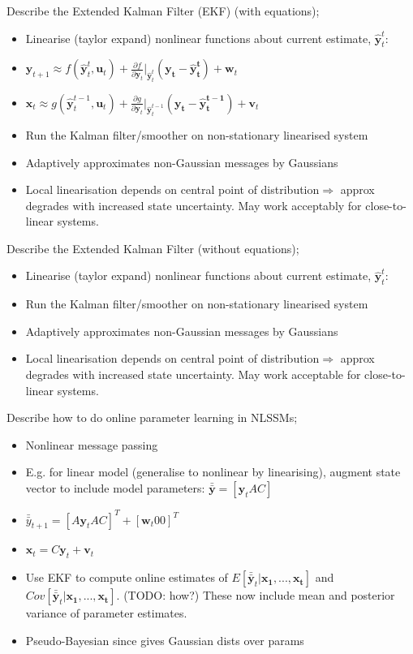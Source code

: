\documentclass{article}
\begin{document}
Describe the Extended Kalman Filter (EKF) (with equations); \begin{itemize} \item Linearise (taylor expand) nonlinear functions about current estimate, $\mathbf{\hat{y}}^t_t$: \item $\mathbf{y}_{t+1}\approx f(\mathbf{\hat{y}}^t_t, \mathbf{u}_t) + \frac{\partial f}{\partial \mathbf{y}_t}|_{\hat{\mathbf{y}}^t_t}(\mathbf{y_t-\hat{y}^t_t})+\mathbf{w}_t$ \item $\mathbf{x}_{t}\approx g(\mathbf{\hat{y}}^{t-1}_t, \mathbf{u}_t) + \frac{\partial g}{\partial \mathbf{y}_t}|_{\hat{\mathbf{y}}^{t-1}_t}(\mathbf{y_t-\hat{y}^{t-1}_t})+\mathbf{v}_t$ \item Run the Kalman filter/smoother on non-stationary linearised system \item Adaptively approximates non-Gaussian messages by Gaussians \item Local linearisation depends on central point of distribution$\Rightarrow$ approx degrades with increased state uncertainty. May work acceptably for close-to-linear systems. \end{itemize}

Describe the Extended Kalman Filter (without equations); \begin{itemize} \item Linearise (taylor expand) nonlinear functions about current estimate, $\mathbf{\hat{y}}^t_t$: \item Run the Kalman filter/smoother on non-stationary linearised system \item Adaptively approximates non-Gaussian messages by Gaussians \item Local linearisation depends on central point of distribution$\Rightarrow$ approx degrades with increased state uncertainty. May work acceptable for close-to-linear systems. \end{itemize}

Describe how to do online parameter learning in NLSSMs; \begin{itemize} \item Nonlinear message passing \item E.g. for linear model (generalise to nonlinear by linearising), augment state vector to include model parameters: $\bar{\bar{\mathbf{y}}}=[\mathbf{y}_t A C]$ \item $\bar{\bar{y}}_{t+1}=[A\mathbf{y}_t A C]^T + [\mathbf{w}_t 0 0 ]^T$ \item $\mathbf{x}_t=C\mathbf{y}_t+\mathbf{v}_t$ \item Use EKF to compute online estimates of $E[\bar{\bar{\mathbf{y}}}_t|\mathbf{x_1,...,x_t}]$ and $Cov[\bar{\bar{\mathbf{y}}}_t|\mathbf{x_1,...,x_t}]$. (TODO: how?) These now include mean and posterior variance of parameter estimates. \item Pseudo-Bayesian since gives Gaussian dists over params \end{itemize}
\end{document}
